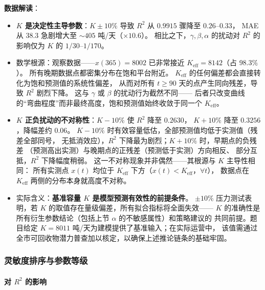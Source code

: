 \documentclass[12pt,a4paper]{ctexart}
\begin{document}
\textbf{数据解读}：
\begin{itemize}
  \item \textbf{$K$ 是决定性主导参数}：$K \pm 10\%$ 导致 $R^2$ 从 $0.9915$ 骤降至 $0.26$--$0.33$，
        MAE 从 $38.3$ 急剧增大至 $\sim 405$ 吨/天（$\times 10.6$）。
        相比之下，$\gamma, \beta, \alpha$ 的扰动对 $R^2$ 的影响仅为 $K$ 的 $1/30$--$1/170$。
  \item 数学根源：观察数据——$x(365) = 8002$ 已非常接近 $K_{\text{eff}} = 8142$（占 $98.3\%$）。
        所有晚期数据点都密集分布在饱和平台附近。
        $K_{\text{eff}}$ 的任何偏差都会直接转化为饱和预测值的系统性偏差，
        从而对所有 $t \geq 90$ 天的点产生同向残差，导致 $R^2$ 剧烈下降。
        这与 $\gamma$ 或 $\beta$ 的扰动行为截然不同——
        后者只改变曲线的``弯曲程度''而非最终高度，饱和预测值始终收敛于同一个 $K_{\text{eff}}$。

  \item \textbf{$K$ 正负扰动的不对称性}：$K -10\%$ 使 $R^2$ 降至 $0.2630$，
        $K +10\%$ 降至 $0.3256$，降幅差约 $0.06$。
        $K -10\%$ 时有效容量低估，全部预测值均低于实测值（残差全部同号，
        无抵消效应），$R^2$ 下降最为剧烈；$K +10\%$ 时，早期点的负残差
        （预测高出实测）与晚期点的正残差（预测低于实测）方向相反、
        部分互抵，$R^2$ 下降幅度稍弱。
        这一不对称现象并非偶然——其根源与 $K$ 主导性相同：
        所有实测点 $x(t)$ 均位于 $K_{\text{eff}}$ 下方（$x(t) < K_{\text{eff}}$，$\forall t$），
        数据点在 $K_{\text{eff}}$ 两侧的分布本身就高度不对称。
  \item 实际含义：\textbf{基准容量 $K$ 是模型预测有效性的前提条件}。
        $\pm 10\%$ 压力测试表明，若 $K$ 的取值存在量级偏差，所有拟合指标将全面失效——
        $K$ 的准确性是所有衍生参数结论（包括上节 $\alpha$ 的不敏感属性）和策略建议的
        共同前提。题目给定 $K = 8011$ 吨/天为建模提供了基准输入；在实际运营中，
        该值需通过全市可回收物潜力普查加以核定，以确保上述推论链条的基础牢固。
\end{itemize}

\subsubsection{灵敏度排序与参数等级}

\paragraph{对 $R^2$ 的影响}
\end{document}
